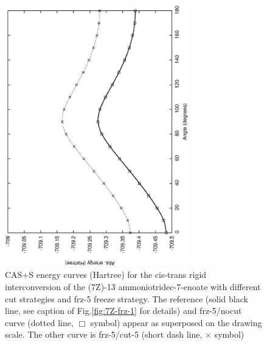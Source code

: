 \begin{figure}[ht]
\begin{center}
\includegraphics[width=8cm,angle=270]{02_localization/images/7Z-frz-5.eps}
\caption{\footnotesize CAS+S energy curves (Hartree) for the cis-trans rigid
interconversion of the (7Z)-13 ammoniotridec-7-enoate with different cut
strategies and frz-5 freeze strategy. The reference (solid black line, see
caption of Fig.\ref{fig:7Z-frz-1} for details) and frz-5/nocut curve
(dotted line, $\Box$ symbol) appear as superposed on the drawing scale.  The
other curve is frz-5/cut-5 (short dash line, $\times$ symbol) 
}
\label{fig:7Z-frz-5}
\end{center}
\end{figure}
